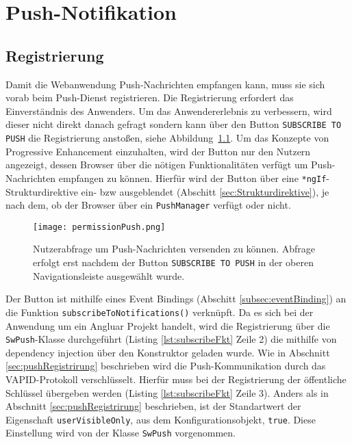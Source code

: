 \chapter{Push-Notifikation}

\section{Registrierung}

Damit die Webanwendung Push-Nachrichten empfangen kann, muss sie sich vorab beim Push-Dienst registrieren. Die Registrierung erfordert das Einverständnis des Anwenders. 
Um das Anwendererlebnis zu verbessern, wird dieser nicht direkt danach gefragt sondern kann über den Button \texttt{SUBSCRIBE TO PUSH} die Registrierung anstoßen, siehe Abbildung~\ref{img:permissionPush}. Um das Konzepte von Progressive Enhancement einzuhalten, wird der Button nur den Nutzern angezeigt, dessen Browser über die nötigen Funktionalitäten verfügt um Push-Nachrichten empfangen zu können. Hierfür wird der Button über eine \texttt{*ngIf}-Strukturdirektive ein- bzw ausgeblendet (Abschitt \ref{sec:Strukturdirektive}), je nach dem, ob der Browser über ein \texttt{PushManager} verfügt oder nicht. 

\begin{figure}[!htb]
    \centering
    \texttt{[image: permissionPush.png]}
    \caption{Nutzerabfrage um Push-Nachrichten versenden zu können. Abfrage erfolgt erst nachdem der Button \texttt{SUBSCRIBE TO PUSH} in der oberen Navigationsleiste ausgewählt wurde.}
    \label{img:permissionPush}
\end{figure}

Der Button ist mithilfe eines Event Bindings (Abschitt \ref{subsec:eventBinding}) an die Funktion \linebreak\texttt{subscribeToNotifications()} verknüpft. Da es sich bei der Anwendung um ein Angluar Projekt handelt, 
wird die Registrierung über die \texttt{SwPush}-Klasse durchgeführt (Listing \ref{lst:subscribeFkt} Zeile 2) die mithilfe von dependency injection über den Konstruktor geladen wurde. Wie in Abschnitt \ref{sec:pushRegistrirung} beschrieben wird die Push-Kommunikation durch das VAPID-Protokoll verschlüsselt. Hierfür muss bei der Registrierung der öffentliche Schlüssel übergeben werden (Listing \ref{lst:subscribeFkt} Zeile 3). Anders als in Abschnitt \ref{sec:pushRegistrirung} beschrieben, ist der Standartwert der Eigenschaft \texttt{userVisibleOnly}, aus dem Konfigurationsobjekt, \texttt{true}. Diese Einstellung wird von der Klasse \texttt{SwPush} vorgenommen. 

